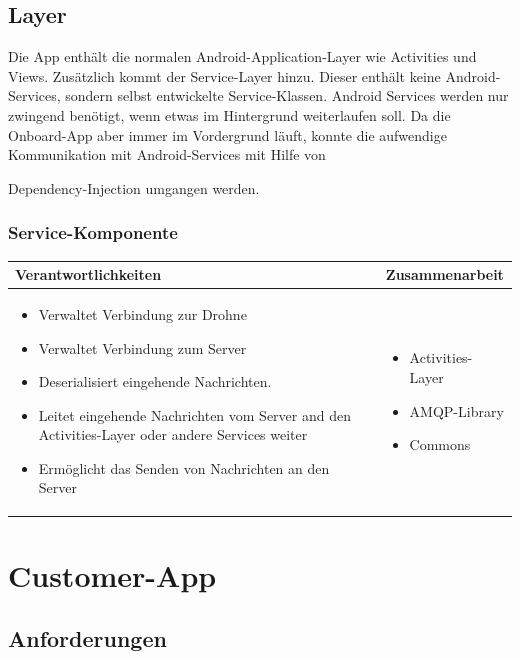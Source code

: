 \subsection{Layer}

Die App enthält die normalen Android-Application-Layer wie Activities und Views. Zusätzlich kommt der Service-Layer hinzu. Dieser enthält keine Android-Services, sondern selbst entwickelte Service-Klassen. Android Services werden nur zwingend benötigt, wenn etwas im Hintergrund weiterlaufen soll. Da die Onboard-App aber immer im Vordergrund läuft, konnte die aufwendige Kommunikation mit Android-Services mit Hilfe von {Dependency-Injection \cite{DI} umgangen werden.\\

\subsubsection{Service-Komponente}

\begin{tabular}{|p{}|p{}|} \hline
	\textbf{Verantwortlichkeiten} & \textbf{Zusammenarbeit} \\ \hline \hline
	
	\begin{itemize}
		\item Verwaltet Verbindung zur Drohne
		\item Verwaltet Verbindung zum Server
		\item Deserialisiert eingehende Nachrichten.
		\item Leitet eingehende Nachrichten vom Server and den Activities-Layer oder andere Services weiter
		\item Ermöglicht das Senden von Nachrichten an den Server
	\end{itemize}&
	\begin{itemize}
		\item Activities-Layer
		\item AMQP-Library
		\item Commons
	\end{itemize}
	\\ \hline
\end{tabular}


\section{Customer-App}

\subsection{Anforderungen}

}
